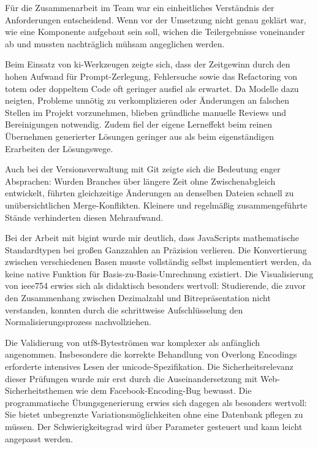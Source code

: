 Für die Zusammenarbeit im Team war ein einheitliches Verständnis der Anforderungen entscheidend. Wenn vor der Umsetzung nicht genau geklärt war, wie eine Komponente aufgebaut sein soll, wichen die Teilergebnisse voneinander ab und mussten nachträglich mühsam angeglichen werden.

Beim Einsatz von \gls{ki}-Werkzeugen zeigte sich, dass der Zeitgewinn durch den hohen Aufwand für Prompt-Zerlegung, Fehlersuche sowie das Refactoring von totem oder doppeltem Code oft geringer ausfiel als erwartet. Da Modelle dazu neigten, Probleme unnötig zu verkomplizieren oder Änderungen an falschen Stellen im Projekt vorzunehmen, blieben gründliche manuelle Reviews und Bereinigungen notwendig. Zudem fiel der eigene Lerneffekt beim reinen Übernehmen generierter Lösungen geringer aus als beim eigenständigen Erarbeiten der Lösungswege.

Auch bei der Versionsverwaltung mit Git zeigte sich die Bedeutung enger Absprachen: Wurden Branches über längere Zeit ohne Zwischenabgleich entwickelt, führten gleichzeitige Änderungen an denselben Dateien schnell zu unübersichtlichen Merge-Konflikten. Kleinere und regelmäßig zusammengeführte Stände verhinderten diesen Mehraufwand.

Bei der Arbeit mit \gls{bigint} wurde mir deutlich, dass JavaScripts mathematische Standardtypen bei großen Ganzzahlen an Präzision verlieren. Die Konvertierung zwischen verschiedenen Basen musste vollständig selbst implementiert werden, da keine native Funktion für Basis-zu-Basis-Umrechnung existiert. Die Visualisierung von \gls{ieee754} erwies sich als didaktisch besonders wertvoll: Studierende, die zuvor den Zusammenhang zwischen Dezimalzahl und Bitrepräsentation nicht verstanden, konnten durch die schrittweise Aufschlüsselung den Normalisierungsprozess nachvollziehen.

Die Validierung von \gls{utf8}-Byteströmen war komplexer als anfänglich angenommen. Insbesondere die korrekte Behandlung von Overlong Encodings erforderte intensives Lesen der \gls{unicode}-Spezifikation. Die Sicherheitsrelevanz dieser Prüfungen wurde mir erst durch die Auseinandersetzung mit Web-Sicherheitsthemen wie dem Facebook-Encoding-Bug bewusst. Die programmatische Übungsgenerierung erwies sich dagegen als besonders wertvoll: Sie bietet unbegrenzte Variationsmöglichkeiten ohne eine Datenbank pflegen zu müssen. Der Schwierigkeitsgrad wird über Parameter gesteuert und kann leicht angepasst werden.

